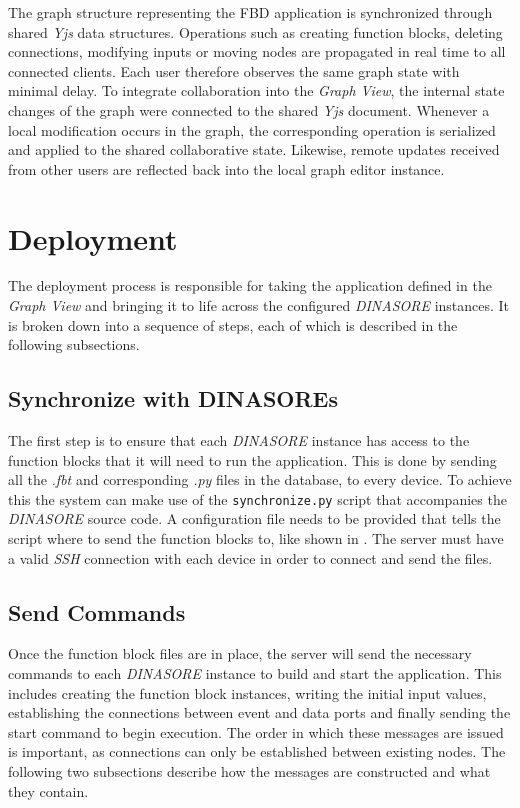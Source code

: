 The graph structure representing the \ac{FBD} application is synchronized through shared \textit{Yjs} data structures. Operations such as creating function blocks, deleting connections, modifying inputs or moving nodes are propagated in real time to all connected clients. Each user therefore observes the same graph state with minimal delay. To integrate collaboration into the \textit{Graph View}, the internal state changes of the graph were connected to the shared \textit{Yjs} document. Whenever a local modification occurs in the graph, the corresponding operation is serialized and applied to the shared collaborative state. Likewise, remote updates received from other users are reflected back into the local graph editor instance.

\section{Deployment} \label{sec:deployment}
The deployment process is responsible for taking the application defined in the \textit{Graph View} and bringing it to life across the configured \textit{DINASORE} instances. It is broken down into a sequence of steps, each of which is described in the following subsections.

\subsection{Synchronize with DINASOREs}
The first step is to ensure that each \textit{DINASORE} instance has access to the function blocks that it will need to run the application. This is done by sending all the \textit{.fbt} and corresponding \textit{.py} files in the database, to every device. To achieve this the system can make use of the \texttt{synchronize.py} script that accompanies the \textit{DINASORE} source code. A configuration file needs to be provided that tells the script where to send the function blocks to, like shown in . The server must have a valid \textit{SSH} connection with each device in order to connect and send the files.

\subsection{Send Commands}
Once the function block files are in place, the server will send the necessary commands to each \textit{DINASORE} instance to build and start the application. This includes creating the function block instances, writing the initial input values, establishing the connections between event and data ports and finally sending the start command to begin execution. The order in which these messages are issued is important, as connections can only be established between existing nodes. The following two subsections describe how the messages are constructed and what they contain.

